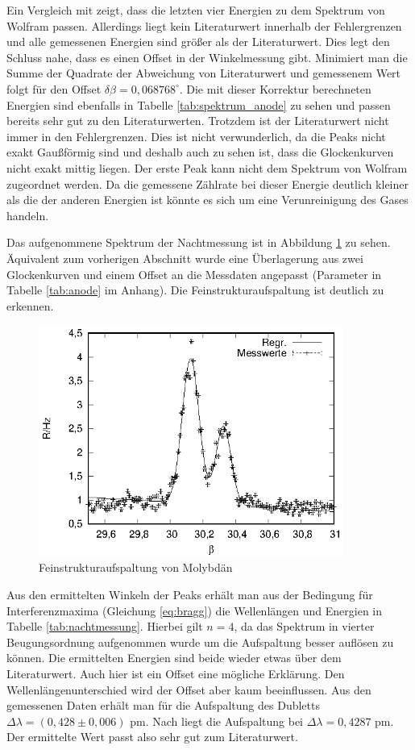 Ein Vergleich mit \cite{booklet} zeigt, dass die letzten vier Energien zu dem Spektrum von Wolfram passen. Allerdings liegt kein Literaturwert innerhalb der Fehlergrenzen und alle gemessenen Energien sind größer als der Literaturwert. Dies legt den Schluss nahe, dass es einen Offset in der Winkelmessung gibt. Minimiert man die Summe der Quadrate der Abweichung von Literaturwert und gemessenem Wert folgt für den Offset $\delta \beta=0,068768^\circ$. Die mit dieser Korrektur berechneten Energien sind ebenfalls in Tabelle \ref{tab:spektrum_anode} zu sehen und passen bereits sehr gut zu den Literaturwerten. Trotzdem ist der Literaturwert nicht immer in den Fehlergrenzen. Dies ist nicht verwunderlich, da die Peaks nicht exakt Gaußförmig sind und deshalb auch zu sehen ist, dass die Glockenkurven nicht exakt mittig liegen. Der erste Peak kann nicht dem Spektrum von Wolfram zugeordnet werden. Da die gemessene Zählrate bei dieser Energie deutlich kleiner als die der anderen Energien ist könnte es sich um eine Verunreinigung des Gases handeln. 

Das aufgenommene Spektrum der Nachtmessung ist in Abbildung \ref{fig:nachtmessung} zu sehen. Äquivalent zum vorherigen Abschnitt wurde eine Überlagerung aus zwei Glockenkurven und einem Offset an die Messdaten angepasst (Parameter in Tabelle \ref{tab:anode} im Anhang). Die Feinstrukturaufspaltung ist deutlich zu erkennen.

\begin{figure}[h]
  \centering
  \includegraphics[width=10cm]{data/Bragg/nachtmessung.eps}
  \caption{Feinstrukturaufspaltung von Molybdän}
  \label{fig:nachtmessung}
\end{figure}

Aus den ermittelten Winkeln der Peaks erhält man aus der Bedingung für Interferenzmaxima (Gleichung \ref{eq:bragg}) die Wellenlängen und Energien in Tabelle \ref{tab:nachtmessung}. Hierbei gilt $n=4$, da das Spektrum in vierter Beugungsordnung aufgenommen wurde um die Aufspaltung besser auflösen zu können. Die ermittelten Energien sind beide wieder etwas über dem Literaturwert. Auch hier ist ein Offset eine mögliche Erklärung. Den Wellenlängenunterschied wird der Offset aber kaum beeinflussen. Aus den gemessenen Daten erhält man für die Aufspaltung des Dubletts $\Delta \lambda=(0,428 \pm 0,006)$ pm. Nach \cite{booklet} liegt die Aufspaltung bei $\Delta \lambda= 0,4287$ pm. Der ermittelte Wert passt also sehr gut zum Literaturwert.

